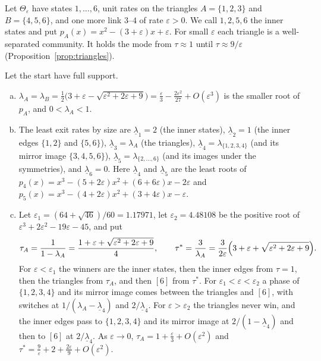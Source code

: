 Let $\Theta_\varepsilon$ have states $1,\dots,6$, unit rates on the triangles
$A=\{1,2,3\}$ and $B=\{4,5,6\}$, and one more link $3$--$4$ of rate
$\varepsilon>0$. We call $1,2,5,6$ the inner states and put
$p_A(x)=x^2-(3+\varepsilon)x+\varepsilon$. For small $\varepsilon$ each triangle
is a well-separated community. It holds the mode from $\tau\approx1$ until
$\tau\approx9/\varepsilon$ (Proposition~\ref{prop:triangles}).

\begin{proposition}\label{prop:triangles}
Let the start have full support.
\begin{enumerate}[(a)]
\item $\lambda_A=\lambda_B=\frac12\bigl(3+\varepsilon-\sqrt{\varepsilon^2+2\varepsilon+9}\bigr)
=\frac\varepsilon3-\frac{2\varepsilon^2}{27}+O(\varepsilon^3)$ is the smaller
root of $p_A$, and $0<\lambda_A<1$.
\item The least exit rates by size are $\underline\lambda_1=2$ (the inner states), $\underline\lambda_2=1$
(the inner edges $\{1,2\}$ and $\{5,6\}$), $\underline\lambda_3=\lambda_A$ (the triangles),
$\underline\lambda_4=\lambda_{\{1,2,3,4\}}$ (and its mirror image $\{3,4,5,6\}$),
$\underline\lambda_5=\lambda_{\{2,\dots,6\}}$ (and its images under the symmetries), and
$\underline\lambda_6=0$. Here $\underline\lambda_4$ and $\underline\lambda_5$ are the least roots of
$p_4(x)=x^3-(5+2\varepsilon)x^2+(6+6\varepsilon)x-2\varepsilon$ and
$p_5(x)=x^3-(4+2\varepsilon)x^2+(3+4\varepsilon)x-\varepsilon$.
\item Let $\varepsilon_1=(64+\sqrt{46})/60=1.17971$, let
$\varepsilon_2=4.48108$ be the positive root of
$\varepsilon^3+2\varepsilon^2-19\varepsilon-45$, and put
\[
\tau_A=\frac1{1-\lambda_A}=\frac{1+\varepsilon+\sqrt{\varepsilon^2+2\varepsilon+9}}4,
\qquad
\tau^*=\frac3{\lambda_A}=\frac3{2\varepsilon}\Bigl(3+\varepsilon+\sqrt{\varepsilon^2+2\varepsilon+9}\Bigr).
\]
For $\varepsilon<\varepsilon_1$ the winners are the inner states, then the inner
edges from $\tau=1$, then the triangles from $\tau_A$, and then $[6]$ from
$\tau^*$. For $\varepsilon_1<\varepsilon<\varepsilon_2$ a phase of
$\{1,2,3,4\}$ and its mirror image comes between the triangles and $[6]$, with
switches at $1/(\lambda_A-\underline\lambda_4)$ and $2/\underline\lambda_4$. For
$\varepsilon>\varepsilon_2$ the triangles never win, and the inner edges pass to
$\{1,2,3,4\}$ and its mirror image at $2/(1-\underline\lambda_4)$ and then to $[6]$ at
$2/\underline\lambda_4$. As $\varepsilon\to0$,
$\tau_A=1+\frac\varepsilon3+O(\varepsilon^2)$ and
$\tau^*=\frac9\varepsilon+2+\frac{2\varepsilon}9+O(\varepsilon^2)$.
\end{enumerate}
\end{proposition}

